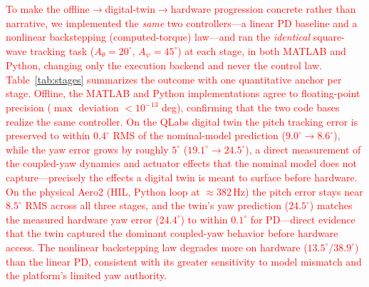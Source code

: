 %


\textcolor{red}{To make the offline$\rightarrow$digital-twin$\rightarrow$hardware
progression concrete rather than narrative, we implemented the \emph{same} two
controllers---a linear PD baseline and a nonlinear backstepping (computed-torque)
law---and ran the \emph{identical} square-wave tracking task
($A_\theta=20^\circ$, $A_\psi=45^\circ$) at each stage, in both MATLAB and Python,
changing only the execution backend and never the control law. Table~\ref{tab:stages}
summarizes the outcome with one quantitative anchor per stage. Offline, the MATLAB
and Python implementations agree to floating-point precision
($\max$ deviation $<10^{-13}$ deg), confirming that the two code bases realize the
same controller. On the QLabs digital twin the pitch tracking error is preserved
to within $0.4^\circ$ RMS of the nominal-model prediction ($9.0^\circ\!\rightarrow\!8.6^\circ$),
while the yaw error grows by roughly $5^\circ$ ($19.1^\circ\!\rightarrow\!24.5^\circ$),
a direct measurement of the coupled-yaw dynamics and actuator effects that the
nominal model does not capture---precisely the effects a digital twin is meant to
surface before hardware. On the physical Aero2 (HIL, Python loop at $\approx$382\,Hz)
the pitch error stays near $8.5^\circ$ RMS across all three stages, and the twin's
yaw prediction ($24.5^\circ$) matches the measured hardware yaw error ($24.4^\circ$)
to within $0.1^\circ$ for PD---direct evidence that the twin captured the dominant
coupled-yaw behavior before hardware access. The nonlinear backstepping law degrades
more on hardware ($13.5^\circ$/$38.9^\circ$) than the linear PD, consistent with its
greater sensitivity to model mismatch and the platform's limited yaw authority.}

